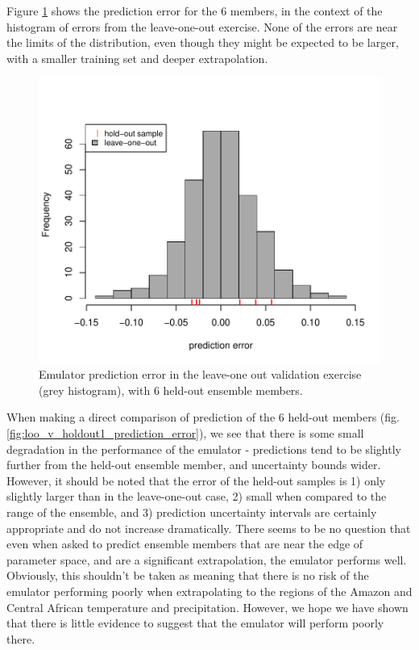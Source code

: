 \documentclass[gmd, manuscript]{copernicus} %
\begin{document}
Figure \ref{fig:holdout1_error_hist} shows the prediction error for the 6 members, in the context of the histogram of errors from the leave-one-out exercise. None of the errors are near the limits of the distribution, even though they might be expected to be larger, with a smaller training set and deeper extrapolation.

\begin{figure}[t]
\includegraphics[width=12cm]{../graphics/holdout1_error_hist.pdf}
\caption{Emulator prediction error in the leave-one out validation exercise (grey histogram), with 6 held-out ensemble members.}
\label{fig:holdout1_error_hist}
\end{figure}


When making a direct comparison of prediction of the 6 held-out members (fig. \ref{fig:loo_v_holdout1_prediction_error}), we see that there is some small degradation in the performance of the emulator - predictions tend to be slightly further from the held-out ensemble member, and uncertainty bounds wider. However, it should be noted that the error of the held-out samples is 1) only slightly larger than in the leave-one-out case, 2) small when compared to the range of the ensemble, and 3) prediction uncertainty intervals are certainly appropriate and do not increase dramatically. There seems to be no question that even when asked to predict ensemble members that are near the edge of parameter space, and are a significant extrapolation, the emulator performs well. Obviously, this shouldn’t be taken as meaning that there is no risk of the emulator performing poorly when extrapolating to the regions of the Amazon and Central African temperature and precipitation. However, we hope we have shown that there is little evidence to suggest that the emulator will perform poorly there. 
\end{document}
